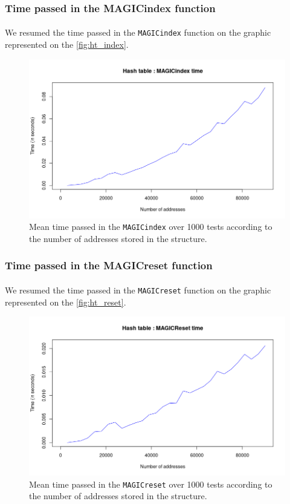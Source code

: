 \documentclass[a4paper, 11pt, oneside]{article}
\begin{document}
\subsubsection{Time passed in the MAGICindex function}
\paragraph{}We resumed the time passed in the \texttt{MAGICindex} function on the graphic represented on the \autoref{fig:ht_index}. 
\begin{figure}[H]
  \centering
  \includegraphics[scale=0.6]{plots/ht_index.png} 
  \caption{Mean time passed in the \texttt{MAGICindex} over 1000 tests according to the number of addresses stored in the structure.}\label{fig:ht_index}
\end{figure}
\subsubsection{Time passed in the MAGICreset function}
\paragraph{}We resumed the time passed in the \texttt{MAGICreset} function on the graphic represented on the \autoref{fig:ht_reset}. 
\begin{figure}[H]
  \centering
  \includegraphics[scale=0.6]{plots/ht_reset.png} 
  \caption{Mean time passed in the \texttt{MAGICreset} over 1000 tests according to the number of addresses stored in the structure.}\label{fig:ht_reset}
\end{figure}
\end{document}
